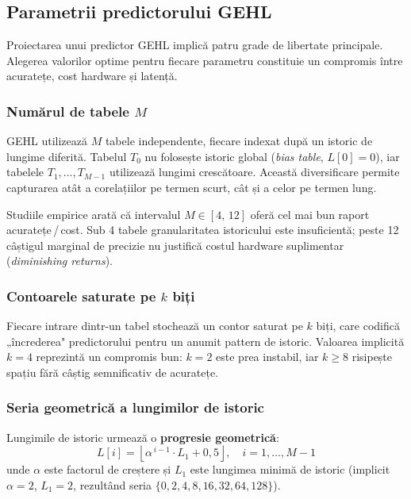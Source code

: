 \subsection{Parametrii predictorului GEHL}

Proiectarea unui predictor GEHL implică patru grade de libertate principale. Alegerea valorilor optime pentru fiecare parametru constituie un compromis
între acuratețe, cost hardware și latență.

\subsubsection*{Numărul de tabele $M$}

GEHL utilizează $M$ tabele independente, fiecare indexat după un istoric de lungime
diferită. Tabelul $T_0$ nu folosește istoric global (\textit{bias table}, $L[0]=0$),
iar tabelele $T_1,\ldots,T_{M-1}$ utilizează lungimi crescătoare.
Această diversificare permite capturarea atât a corelațiilor pe termen scurt, cât și
a celor pe termen lung.

Studiile empirice arată că intervalul $M \in [4,\,12]$ oferă cel mai bun raport
acuratețe\,/\,cost. Sub 4 tabele granularitatea istoricului este insuficientă; peste 12
câștigul marginal de precizie nu justifică costul hardware suplimentar
(\textit{diminishing returns}).

\subsubsection*{Contoarele saturate pe $k$ biți}

Fiecare intrare dintr-un tabel stochează un contor saturat pe $k$ biți, care codifică
„încrederea" predictorului pentru un anumit pattern de istoric.
Valoarea implicită $k=4$ reprezintă un compromis bun: $k=2$ este prea instabil, iar
$k\geq8$ risipește spațiu fără câștig semnificativ de acuratețe.

\subsubsection*{Seria geometrică a lungimilor de istoric}

Lungimile de istoric urmează o \textbf{progresie geometrică}:
\[
  L[i] = \left\lfloor \alpha^{\,i-1} \cdot L_1 + 0{,}5 \right\rfloor, \quad i = 1,\ldots,M-1
\]
unde $\alpha$ este factorul de creștere și $L_1$ este lungimea minimă de istoric
(implicit $\alpha=2$, $L_1=2$, rezultând seria $\{0,2,4,8,16,32,64,128\}$).

